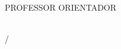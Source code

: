
\begin{titlepage}
  \begin{center}
    \Institution\\
    \Course\\
    \Pretitle\\
    \vfill

    \textbf{\Title}\\
    \vfill

    \AUTHOR\\
    \vfill

    PROFESSOR ORIENTADOR\\
    \Counselor\\
    \vfill

    \begin{espacosimples}
      {\AddressOfPublishing}/{\YearOfPublishing}
    \end{espacosimples}
  \end{center}
\end{titlepage}
